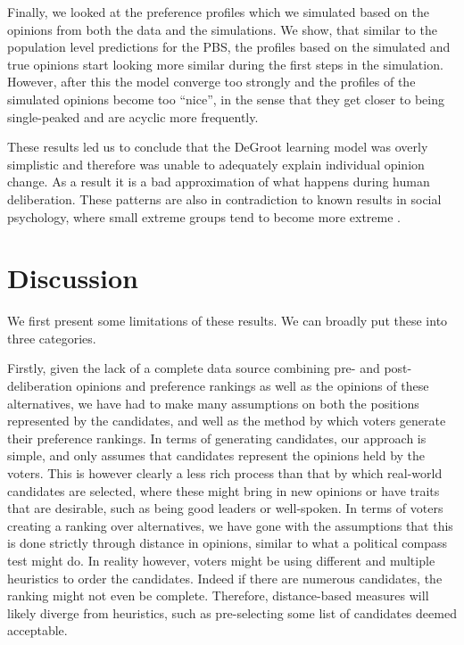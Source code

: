 Finally, we looked at the preference profiles which we simulated based on the
opinions from both the data and the simulations. We show, that similar to the
population level predictions for the PBS, the profiles based on the simulated
and true opinions start looking more similar during the first steps in the
simulation. However, after this the model converge too strongly and the
profiles of the simulated opinions become too ``nice'', in the sense that they
get closer to being single-peaked and are acyclic more frequently.

These results led us to conclude that the DeGroot learning model was overly
simplistic and therefore was unable to adequately explain individual opinion
change. As a result it is a bad approximation of what happens during human
deliberation. These patterns are also in contradiction to known results in
social psychology, where small extreme groups tend to become more extreme \cite{myersPolarizingEffectGroup1975}.

\section{Discussion}

We first present some limitations of these results. We can broadly put these
into three categories.

Firstly, given the lack of a complete data source combining pre- and
post-deliberation opinions and preference rankings as well as the opinions of
these alternatives, we have had to make many assumptions on both the positions
represented by the candidates, and well as the method by which voters generate
their preference rankings. In terms of generating candidates, our
approach is simple, and only assumes that candidates represent the opinions held
by the voters. This is however clearly a less rich process than that by which
real-world candidates are selected, where these might bring in new opinions or
have traits that are desirable, such as being good leaders or well-spoken. In
terms of voters creating a ranking over alternatives, we have gone with the
assumptions that this is done strictly through distance in opinions, similar to
what a political compass test might do. In reality however, voters might be
using different and multiple heuristics to order the candidates. Indeed if
there are numerous candidates, the ranking might not even be complete.
Therefore, distance-based measures will likely diverge from heuristics, such as
pre-selecting some list of candidates deemed acceptable.


